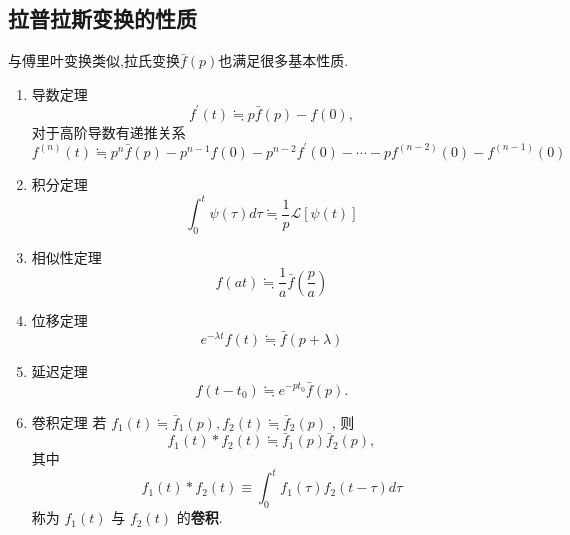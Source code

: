 \subsection{拉普拉斯变换的性质}
与傅里叶变换类似,拉氏变换$\bar{f}(p)$也满足很多基本性质.
\begin{enumerate}
    \item 导数定理
        \begin{equation}
        f^{\prime}(t) \fallingdotseq  p \bar{f}(p)-f(0),
        \end{equation}
        对于高阶导数有递推关系
        \begin{equation}
            f^{(n)}(t) \fallingdotseq p^n \bar{f}(p)-p^{n-1} f(0)-p^{n-2} f^{\prime}(0)-\cdots-p f^{(n-2)}(0)-f^{(n-1)}(0)
        \end{equation}
    \item 积分定理
        \begin{equation}
        \int_0^t \psi(\tau) d \tau \fallingdotseq  \frac{1}{p} \mathcal{L}[\psi(t)]
        \end{equation}
    \item 相似性定理 
    \begin{equation}
         f(a t) \fallingdotseq  
         \frac{1}{a} \bar{f}\left(\frac{p}{a}\right)
    \end{equation}
        
    \item 位移定理 
        \begin{equation}       
         e^{-\lambda t} f(t) \fallingdotseq  \bar{f}(p+\lambda)
        \end{equation}

    \item 延迟定理 
    \begin{equation}       
        f\left(t-t_0\right) \fallingdotseq  e^{-p t_0} \bar{f}(p).
    \end{equation}

    \item 卷积定理 若  $f_1(t) \fallingdotseq  \bar{f}_1(p), f_2(t) \fallingdotseq  \bar{f}_2(p)$ , 则 
    \begin{equation}       
        f_1(t) * f_2(t) \fallingdotseq  \bar{f}_1(p) \bar{f}_2(p),
    \end{equation}
    其中
    \begin{equation}        
    f_1(t) * f_2(t) \equiv \int_0^t f_1(\tau) f_2(t-\tau) d \tau
    \end{equation}
    称为 $f_1(t)$ 与 $f_2(t)$ 的\textbf{卷积}.
\end{enumerate}

